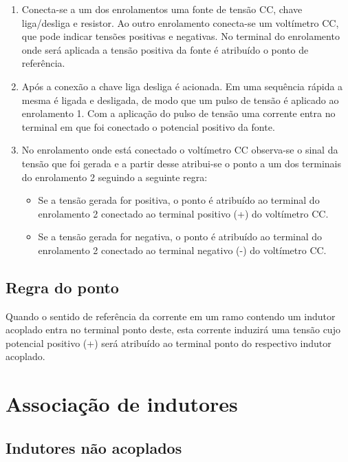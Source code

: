 \documentclass[12pt,fleqn]{book} %
\begin{document}
{    \begin{enumerate}
    \item Conecta-se a um dos enrolamentos uma fonte de tensão CC, chave liga/desliga e resistor. Ao outro enrolamento conecta-se um voltímetro CC, que pode indicar tensões positivas e negativas. No terminal do enrolamento onde será aplicada a tensão positiva da fonte é atribuído o ponto de referência.
    \item Após a conexão a chave liga desliga é acionada. Em uma sequência rápida a mesma é ligada e desligada, de modo que um pulso de tensão é aplicado ao enrolamento 1. Com a aplicação do pulso de tensão uma corrente entra no terminal em que foi conectado o potencial positivo da fonte.
    \item No enrolamento onde está conectado o voltímetro CC observa-se o sinal da tensão que foi gerada e a partir desse atribui-se o ponto a um dos terminais do enrolamento 2 seguindo a seguinte regra:
    \begin{itemize}
    \item Se a tensão gerada for positiva, o ponto é atribuído ao terminal do enrolamento 2 conectado ao terminal positivo (+) do voltímetro CC.
    \item	Se a tensão gerada for negativa, o ponto é atribuído ao terminal do enrolamento 2 conectado ao terminal negativo (-) do voltímetro CC.
    \end{itemize}
    \end{enumerate}
    
    \subsection{Regra do ponto}

\begin{remark}
Quando o sentido de referência da corrente em um ramo contendo um indutor acoplado entra no terminal ponto deste, esta corrente induzirá uma tensão cujo potencial positivo (+) será atribuído ao terminal ponto do respectivo indutor acoplado.
\end{remark}


\section{Associação de indutores}

    \subsection{Indutores não acoplados}
    
}
\end{document}
